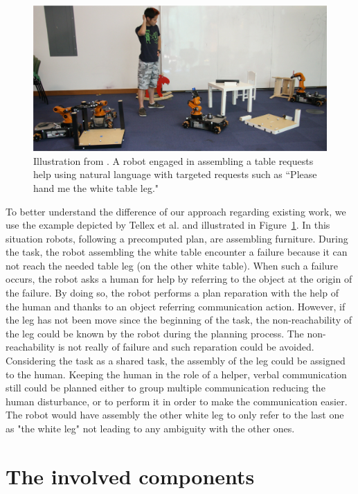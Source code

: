 \begin{figure}[h!]
\centering
\includegraphics[scale=0.25]{figures/chapter5/tellex.png}
\caption{\label{fig:chap5_tellex} Illustration from \cite{tellex_2014_asking}.
A robot engaged in assembling a table requests help using natural language with targeted requests such as “Please hand me the white table leg." }
\end{figure}

To better understand the difference of our approach regarding existing work, we use the example depicted by Tellex et al. \cite{tellex_2014_asking} and illustrated in Figure~\ref{fig:chap5_tellex}. In this situation robots, following a precomputed plan, are assembling furniture. During the task, the robot assembling the white table encounter a failure because it can not reach the needed table leg (on the other white table). When such a failure occurs, the robot asks a human for help by referring to the object at the origin of the failure. By doing so, the robot performs a plan reparation with the help of the human and thanks to an object referring communication action. However, if the leg has not been move since the beginning of the task, the non-reachability of the leg could be known by the robot during the planning process. The non-reachability is not really of failure and such reparation could be avoided. Considering the task as a shared task, the assembly of the leg could be assigned to the human. Keeping the human in the role of a helper, verbal communication still could be planned either to group multiple communication reducing the human disturbance, or to perform it in order to make the communication easier. The robot would have assembly the other white leg to only refer to the last one as "the white leg" not leading to any ambiguity with the other ones.


\section{The involved components}

